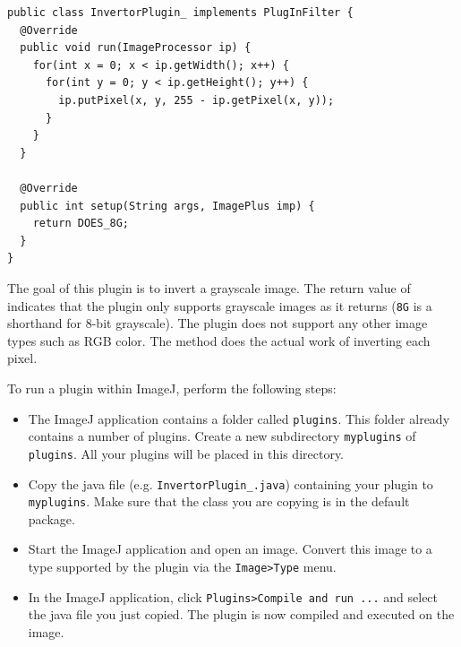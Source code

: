 \documentclass{book}
\begin{document}
\begin{lstlisting}
public class InvertorPlugin_ implements PlugInFilter {
  @Override
  public void run(ImageProcessor ip) {
    for(int x = 0; x < ip.getWidth(); x++) {
      for(int y = 0; y < ip.getHeight(); y++) {
        ip.putPixel(x, y, 255 - ip.getPixel(x, y));
      }
    }
  }
  
  @Override
  public int setup(String args, ImagePlus imp) {
    return DOES_8G;  
  }
}
\end{lstlisting}

The goal of this plugin is to invert a grayscale image. The return value of  indicates that the plugin only supports grayscale images as it returns  (\texttt{8G} is a shorthand for 8-bit grayscale). The plugin does not support any other image types such as RGB color. The  method does the actual work of inverting each pixel.

To run a plugin within ImageJ, perform the following steps:
\begin{itemize}
  \item The ImageJ application contains a folder called \texttt{plugins}. This folder already contains a number of plugins. Create a new subdirectory \texttt{myplugins} of \texttt{plugins}. All your plugins will be placed in this directory.
  \item Copy the java file (e.g. \texttt{InvertorPlugin\_.java}) containing your plugin to \texttt{myplugins}. Make sure that the class you are copying is in the default package.
  \item Start the ImageJ application and open an image. Convert this image to a type supported by the plugin via the \texttt{Image>Type} menu.
  \item In the ImageJ application, click \texttt{Plugins>Compile and run ...} and select the java file you just copied. The plugin is now compiled and executed on the image. 
\end{itemize}
\end{document}
